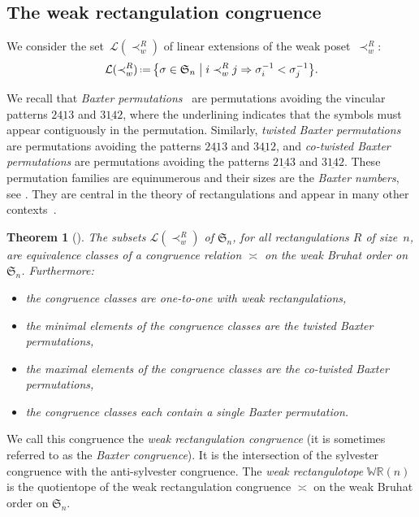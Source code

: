 \documentclass{amsart}
\newtheorem{theorem}{Theorem}%
\theoremstyle{definition}
\newcommand{\f}[1]{\mathfrak{#1}} %
\newcommand{\bigset}[2]{\big\{ #1 \;\big|\; #2 \big\}} %
\newcommand{\eqdef}{\mbox{\,\raisebox{0.2ex}{\scriptsize\ensuremath{\mathrm:}}\ensuremath{=}\,}} %
\renewcommand{\implies}{\Rightarrow} %
\newcommand{\darkblue}{\color{darkblue}} %
\newcommand{\defn}[1]{\textsl{\darkblue #1}} %
\newcommand{\OEIS}[1]{{\rm \href{http://oeis.org/#1}{\cite[\texttt{#1}]{OEIS}}}}
\newcommand{\polytope}[1]{\mathds{#1}} %
\newcommand{\WRP}{\polytope{WR}} %
\newcommand{\weakeq}{\asymp}
\begin{document}

\subsection{The weak rectangulation congruence}
\label{subsec:weakRectangulationCongruence}

We consider the set~$\mathcal{L}(\prec_w^R)$ of linear extensions of the weak poset~$\prec_w^R$:
\[
\mathcal{L}(\prec_w^R) \eqdef \bigset{\sigma\in\f{S}_n }{ i\prec_w^R j\implies \sigma^{-1}_i < \sigma^{-1}_j}.
\]

We recall that \defn{Baxter permutations}~\cite{MR0491652,MR0555815} are permutations avoiding the vincular patterns $2\underline{41}3$ and $3\underline{14}2$, where the underlining indicates that the symbols must appear contiguously in the permutation.
Similarly, \defn{twisted Baxter permutations} are permutations avoiding the patterns $2\underline{41}3$ and $3\underline{41}2$, and \defn{co-twisted Baxter permutations} are permutations avoiding the patterns $2\underline{14}3$ and $3\underline{14}2$.
These permutation families are equinumerous and their sizes are the \defn{Baxter numbers}, see \OEIS{A001181}.
They are central in the theory of rectangulations and appear in many other contexts~\cite{MR2763051}.

\begin{theorem}[\cite{MR2871762}]
  \label{thm:weakCong}
  The subsets $\mathcal{L}(\prec_w^R)$ of $\f{S}_n$, for all rectangulations $R$ of size~$n$, 
  are equivalence classes of a congruence relation $\weakeq$ on the weak Bruhat order on $\f{S}_n$.
  Furthermore:
  \begin{itemize}
  \item the congruence classes are one-to-one with weak rectangulations,  
  \item the minimal elements of the congruence classes are the twisted Baxter permutations,
  \item the maximal elements of the congruence classes are the co-twisted Baxter permutations,
  \item the congruence classes each contain a single Baxter permutation. %
  \end{itemize}
\end{theorem}

We call this congruence the \defn{weak rectangulation congruence} (it is sometimes referred to as the \defn{Baxter congruence}).
It is the intersection of the sylvester congruence with the anti-sylvester congruence.
The \defn{weak rectangulotope} $\WRP(n)$ is the quotientope of the weak rectangulation congruence $\weakeq$ on the weak Bruhat order on $\f{S}_n$.
\end{document}
